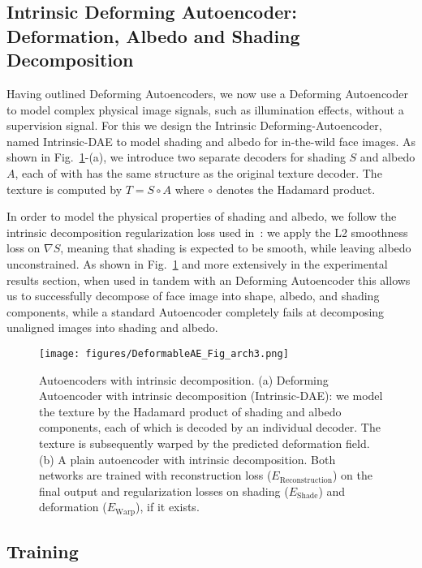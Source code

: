 \documentclass[runningheads]{llncs}
\begin{document}
\subsection{Intrinsic Deforming Autoencoder: Deformation, Albedo and Shading  Decomposition}
\label{sec:idae}
Having outlined  Deforming Autoencoders, we now use a Deforming Autoencoder to  model complex physical image signals, such as illumination effects, without a supervision signal. For this we design the Intrinsic Deforming-Autoencoder, named Intrinsic-DAE to model shading and albedo for in-the-wild face images. As shown in Fig.~\ref{fig:daeIntrinsicStructure}-(a), we introduce two separate decoders for shading $S$ and albedo $A$, each of with has the same structure as the original texture decoder. The texture is computed by $T=S \circ A$ where $\circ$ denotes the Hadamard product. 

In order to model the physical properties of shading and albedo, we follow the intrinsic decomposition regularization loss used in~\cite{ShuYHSSS17}: we apply the L2 smoothness loss on $\nabla S$, meaning that shading is expected to be smooth, while leaving albedo unconstrained. As shown in Fig.~\ref{fig:daeIntrinsicStructure} and more extensively in the experimental results section, when used in tandem with an Deforming Autoencoder this allows us to successfully decompose of face image into shape, albedo, and shading components, while a standard Autoencoder completely fails at decomposing unaligned images into shading and albedo.   
\begin{figure}[h]
    \centering
    \texttt{[image: figures/DeformableAE\_Fig\_arch3.png]}
    \caption{Autoencoders with intrinsic decomposition. (a) Deforming Autoencoder with intrinsic decomposition (Intrinsic-DAE): we model the texture by the Hadamard product of shading and albedo components, each of which is decoded by an individual decoder. The texture is subsequently warped by the predicted deformation field. (b) A plain autoencoder with intrinsic decomposition. Both networks are trained with reconstruction loss ($E_{\text{Reconstruction}}$) on the final output and regularization losses on shading ($E_{\text{Shade}}$) and deformation ($E_{\text{Warp}}$), if it exists. }
    \label{fig:daeIntrinsicStructure}
\end{figure}


\subsection{Training}
\end{document}
